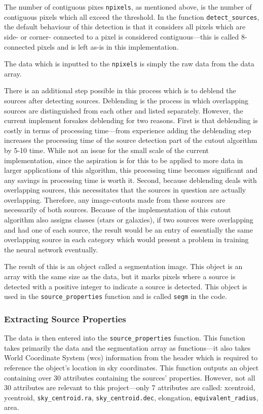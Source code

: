 \documentclass[a4paper,fleqn,usenatbib]{mnras}
\begin{document}
The number of contiguous pixes \lstinline{npixels}, as mentioned above, is the number of contiguous pixels which all exceed the threshold. In the function \lstinline{detect_sources}, the default behaviour of this detection is that it considers all pixels which are side- or corner- connected to a pixel is considered contiguous---this is called 8-connected pixels and is left as-is in this implementation. 

The data which is inputted to the \lstinline{npixels} is simply the raw data from the data array.

There is an additional step possible in this process which is to deblend the sources after detecting sources. Deblending is the process in which overlapping sources are distinguished from each other and listed separately. However, the current implement forsakes deblending for two reasons. First is that deblending is costly in terms of processing time---from experience adding the deblending step increases the processing time of the source detection part of the cutout algorithm by 5-10 time. While not an issue for the small scale of the current implementation, since the aspiration is for this to be applied to more data in larger applications of this algorithm, this processing time becomes significant and any savings in processing time is worth it. Second, because deblending deals with overlapping sources, this necessitates that the sources in question are actually overlapping. Therefore, any image-cutouts made from these sources are necessarily of both sources. Because of the implementation of this cutout algorithm also assigns classes (stars or galaxies), if two sources were overlapping and had one of each source, the result would be an entry of essentially the same overlapping source in each category which would present a problem in training the neural network eventually. 

The result of this is an object called a segmentation image. This object is an array with the same size as the data, but it marks pixels where a source is detected with a positive integer to indicate a source is detected.  This object is used in the \lstinline{source_properties} function and is called \lstinline{segm} in the code. 

\subsubsection{Extracting Source Properties}
The data is then entered into the \lstinline{source_properties} function. This function takes primarily the data and the segmentation array as functions---it also takes World Coordinate System (wcs) information from the header which is required to reference the object's location in sky coordinates. This function outputs an object containing over 30 attributes containing the sources' properties. However, not all 30 attributes are relevant to this project---only 7 attributes are called: xcentroid, ycentroid, \lstinline{sky_centroid.ra}, \lstinline{sky_centroid.dec}, elongation, \lstinline{equivalent_radius}, area. 
\end{document}
